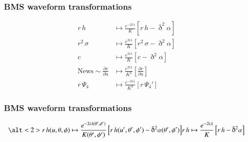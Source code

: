 \documentclass[12pt,xcolor={dvipsnames}]{beamer}
\renewcommand{\vec}{\bm}
\renewcommand{\vec}[1]{\boldsymbol{#1}}
\begin{document}
\begin{frame}
  \frametitle{BMS waveform transformations}
  \vspace{-0.2in}
  \begin{align*}
    r\, h %
    &\mapsto %
      \frac{e^{-2i \lambda}} {K} \left[ r\, h - \bar{\eth}^{2} \alpha
      \right] %
    \\
    r^{2}\, \sigma %
    &\mapsto %
      \frac{e^{2i \lambda}} {K} \left[ r^{2}\, \sigma - \eth^{2}
      \alpha \right] %
    \\
    c %
    &\mapsto %
      \frac{e^{2i \lambda}} {K} \left[ c - \eth^{2} \alpha \right] %
    \\[15pt]
    \text{News} \sim \frac{\partial c} {\partial u} %
    &\mapsto %
      \frac{e^{2i \lambda}} {K^{2}} \left[ \frac{\partial c}
      {\partial u} \right] %
    \\[15pt]
    r\, \Psi_{4} %
    &\mapsto %
      \frac{e^{-2i \lambda}} {K^{3}} \left[ r\, \Psi_{4}'\right]
  \end{align*}
\end{frame}

\begin{frame}
  \frametitle{BMS waveform transformations}
  \begin{equation*}
    \alt<2>{
      r\, h(u, \theta, \phi) \mapsto \frac{e^{-2i \lambda(\theta', \phi')}}
      {K(\theta', \phi')} \left[ r\, h(u', \theta', \phi') -
        \bar{\eth}^{2} \alpha(\theta', \phi') \right]}{r\, h \mapsto
      \frac{e^{-2i \lambda}} {K\vphantom{(0)}} \left[ r\, h -
        \bar{\eth}^{2} \alpha \right]}
  \end{equation*}
\end{frame}

\end{document}
